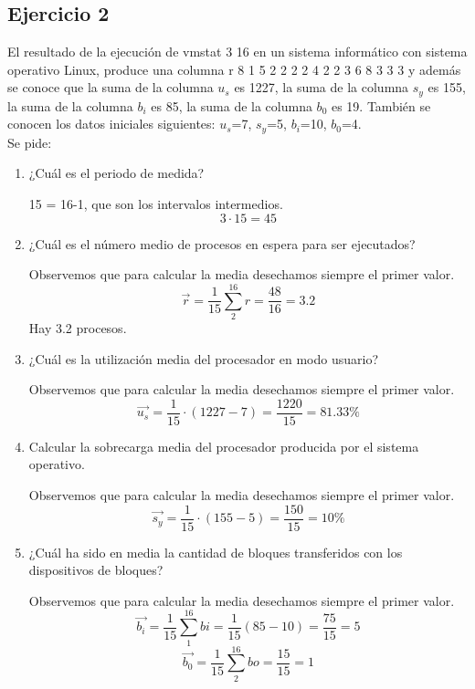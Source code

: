 \subsection{Ejercicio 2}
\noindent
El resultado de la ejecución de vmstat 3 16 en un sistema informático con sistema operativo Linux, produce una columna r 8 1 5 2 2 2 2 4 2 2 3 6 8 3 3 3 y además se conoce que la suma de la columna \textbf{$u_s$} es 1227, la suma de la columna \textbf{$s_y$} es 155, la suma de la columna \textbf{$b_i$} es 85, la suma de la columna \textbf{$b_0$} es 19. También se conocen los datos iniciales siguientes: $u_s$=7, $s_y$=5, $b_i$=10, $b_0$=4.\\
Se pide:
\begin{enumerate}
    \item ¿Cuál es el periodo de medida?
\begin{tcolorbox}[colback=white,colframe=cyan!50!black,fonttitle=\bfseries]
15 = 16-1, que son los intervalos intermedios.
\[
3\cdot 15=45
\]
\end{tcolorbox}    
    \item ¿Cuál es el número medio de procesos en espera para ser ejecutados?
\begin{tcolorbox}[colback=white,colframe=cyan!50!black,fonttitle=\bfseries]
Observemos que para calcular la media desechamos siempre el primer valor.
\[
\Vec{r}=\dfrac{1}{15}\sum_{2}^{16}r=\dfrac{48}{16}=3.2
\]
Hay 3.2 procesos.
\end{tcolorbox}    
    \item ¿Cuál es la utilización media del procesador en modo usuario?
\begin{tcolorbox}[colback=white,colframe=cyan!50!black,fonttitle=\bfseries]
Observemos que para calcular la media desechamos siempre el primer valor.
\[
\Vec{u_s}=\dfrac{1}{15}\cdot(1227-7)=\dfrac{1220}{15}=81.33\%
\]
\end{tcolorbox}    
    \item Calcular la sobrecarga media del procesador producida por el sistema operativo.
\begin{tcolorbox}[colback=white,colframe=cyan!50!black,fonttitle=\bfseries]
Observemos que para calcular la media desechamos siempre el primer valor.
\[
\Vec{s_y}=\dfrac{1}{15}\cdot(155-5)=\dfrac{150}{15}=10\%
\]
\end{tcolorbox}    
    \item ¿Cuál ha sido en media la cantidad de bloques transferidos con los dispositivos de bloques?
\begin{tcolorbox}[colback=white,colframe=cyan!50!black,fonttitle=\bfseries]
Observemos que para calcular la media desechamos siempre el primer valor.
\[
\Vec{b_i}=\dfrac{1}{15}\sum_1^{16}bi=\dfrac{1}{15}(85-10)=\dfrac{75}{15}=5
\]
\[
\Vec{b_0}=\dfrac{1}{15}\sum_2^{16}bo=\dfrac{15}{15}=1
\]
\end{tcolorbox}    
\end{enumerate}
